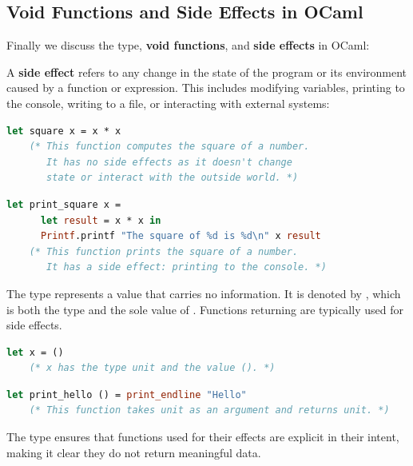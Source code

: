 \newpage 

\subsection{Void Functions and Side Effects in OCaml}

Finally we discuss the  type, \textbf{void functions}, and \textbf{side effects} in OCaml:

\begin{Def}

    A \textbf{side effect} refers to any change in the state of the program or its environment caused by a function or expression. 
    This includes modifying variables, printing to the console, writing to a file, or interacting with external systems:
    
    \begin{lstlisting}[language=OCaml, caption={Function Without a Side Effect}, numbers=none]
    let square x = x * x
    (* This function computes the square of a number.
       It has no side effects as it doesn't change 
       state or interact with the outside world. *)
    \end{lstlisting}
    
    \begin{lstlisting}[language=OCaml, caption={Function With a Side Effect}, numbers=none]
    let print_square x =
      let result = x * x in
      Printf.printf "The square of %d is %d\n" x result
    (* This function prints the square of a number.
       It has a side effect: printing to the console. *)
    \end{lstlisting}
    \end{Def}
    

\begin{Def}

The  type represents a value that carries no information. It is denoted by \snippet{()}, which is both the type and the sole value of . Functions returning  are typically used for side effects.

\begin{lstlisting}[language=OCaml, caption={Unit Type and Value}, numbers=none]
    let x = ()
    (* x has the type unit and the value (). *)
\end{lstlisting}

\begin{lstlisting}[language=OCaml, caption={Function Returning Unit}, numbers=none]
    let print_hello () = print_endline "Hello"
    (* This function takes unit as an argument and returns unit. *)
\end{lstlisting}

The  type ensures that functions used for their effects are explicit in their intent, making it clear they do not return meaningful data.
\end{Def}


